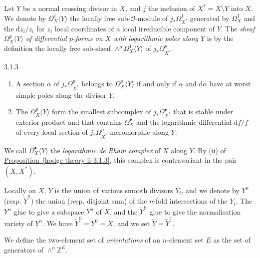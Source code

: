     Let \(Y\) be a normal crossing divisor in \(X\), and \(j\) the inclusion of \(X^*=X\setminus  Y\) into \(X\).
    We denote by \(\Omega _X^1\langle  Y\rangle \) the locally free sub-\(\mathcal {O}\)-module of \(j_*\Omega _{X^*}^1\) generated by \(\Omega _X^1\) and the \(\mathrm {d} z_i/z_i\) for \(z_i\) local coordinates of a local irreducible component of \(Y\).
    The \emph{sheaf \(\Omega _X^p\langle  Y\rangle \) of differential \(p\)-forms on \(X\) with logarithmic poles along \(Y\)} is by the definition the locally free sub-sheaf \(\wedge ^p\Omega _X^1\langle  Y\rangle \) of \(j_*\Omega _{X^*}^p\).\begin{proposition}{3.1.3}\label{hodge-theory-ii-3.1.3}\skipsinglepar\begin{enumerate}
    
 \item[(i)]
      A section \(\alpha \) of \(j_*\Omega _{X^*}^p\) belongs to \(\Omega _X^p\langle  Y\rangle \) if and only if \(\alpha \) and \(\mathrm {d}\alpha \) have at worst simple poles along the divisor \(Y\).
    

    
 \item[(ii)]
      The \(\Omega _X^p\langle  Y\rangle \) form the smallest subcomplex of \(j_*\Omega _{X^*}^\bullet \) that is stable under exterior product and that contains \(\Omega _X^\bullet \) and the logarithmic differential \(\mathrm {d} f/f\) of every local section of \(j_*\Omega _{X^*}^p\) meromorphic along \(Y\).
    

  \end{enumerate}\end{proposition}\par{}We call \(\Omega _X^\bullet \langle  Y\rangle \) the \emph{logarithmic de Rham complex} of \(X\) along \(Y\).
  By (ii) of \hyperref[hodge-theory-ii-3.1.3]{Proposition~\ref*{hodge-theory-ii-3.1.3}}, this complex is contravariant in the pair \((X,X^*)\).\label{hodge-theory-ii-3.1.4}\par{}Locally on \(X\), \(Y\) is the union of various smooth divisors \(Y_i\), and we denote by \(Y^n\) (resp. \(\widetilde {Y}^n\)) the union (resp. disjoint sum) of the \(n\)-fold intersections of the \(Y_i\).
    The \(Y^n\) glue to give a subspace \(Y^n\) of \(X\), and the \(\widetilde {Y}^n\) glue to give the normalisation variety of \(Y^n\).
    We have \(\widetilde {Y}^0=Y^0=X\), and we set \(\widetilde {Y}=\widetilde {Y}^1\).\par{}We define the two-element set of \emph{orientations} of an \(n\)-element set \(E\) as the set of generators of \(\wedge ^n\mathbb {Z}^E\).
    
